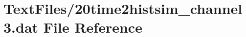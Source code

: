 \hypertarget{20time2histsim__channel3_8dat}{}\section{Text\+Files/20time2histsim\+\_\+channel3.dat File Reference}
\label{20time2histsim__channel3_8dat}
